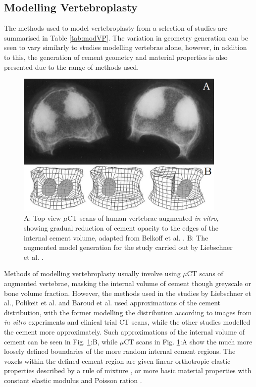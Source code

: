 \subsection{Modelling Vertebroplasty}

The methods used to model vertebroplasty from a selection of studies are
summarised in Table \ref{tab:modVP}. The variation in geometry
generation can be seen
to vary similarly to studies modelling vertebrae alone, however, in
addition to this, the generation of cement geometry and material
properties is also presented due to the range of methods used.

\begin{figure}[ht!]

\centering
  \includegraphics[width=4in]{images/VP_scan_vs_model_lit_rev.png}
  \caption{A: Top view $\mu$CT scans of human vertebrae augmented \textit{in vitro}, showing gradual reduction of cement opacity to the edges of the internal cement volume, adapted from Belkoff et al. \cite{belkoff2001biomechanics}. B: The augmented model generation for the study carried out by Liebschner et al. \cite{Liebschner2001}.}
\label{fig:VP_scan_vs_model_lit_rev}
\end{figure}

Methods of modelling vertebroplasty usually involve using $\mu$CT scans of
augmented vertebrae, masking the internal volume of cement though
greyscale or bone volume fraction. However, the methods used in the
studies by Liebschner et al., Polikeit et al. and Baroud et al.
\cite{Liebschner2001,Baroud2003,Polikeit2003} used approximations of the cement
distribution,
with
the former modelling the distribution according to images from \emph{in
vitro} experiments and clinical trial CT scans, while the other studies
modelled the cement more approximately. Such approximations of the internal volume of cement can be seen in Fig. \ref{fig:VP_scan_vs_model_lit_rev}:B, while $\mu$CT scans in Fig. \ref{fig:VP_scan_vs_model_lit_rev}:A show the much more loosely defined boundaries of the more random internal cement regions. The voxels within the defined
cement region are given linear orthotropic elastic properties described
by a rule of mixture \cite{Chevalier2008}, or more basic material properties
with
constant elastic modulus and Poisson ration \cite{Wijayathunga2008,Liebschner2001,Baroud2003,Polikeit2003}.

